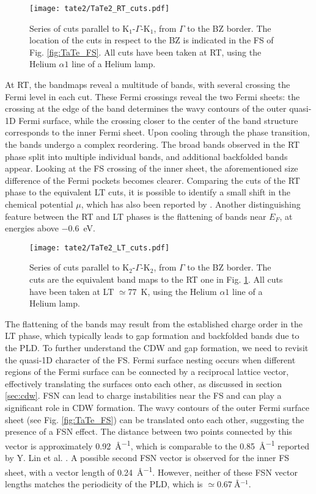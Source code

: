 \begin{figure}[t!]
	\centering
	\texttt{[image: tate2/TaTe2\_RT\_cuts.pdf]}
	\caption{Series of cuts parallel to K$_1$-$\Gamma$-K$_1$, from $\Gamma$ to the BZ border. The location of the cuts in respect to the BZ is indicated in the FS of Fig. \ref{fig:TaTe_FS}. All cuts have been taken at RT, using the Helium $\alpha1$ line of a Helium lamp.}
	\label{fig:TaTe_RT_cuts}
\end{figure}

At RT, the bandmaps reveal a multitude of bands, with several crossing the Fermi level in each cut.
These Fermi crossings reveal the two Fermi sheets: the crossing at the edge of the band determines the wavy contours of the outer quasi-1D Fermi surface, while the crossing closer to the center of the band structure corresponds to the inner Fermi sheet.
Upon cooling through the phase transition, the bands undergo a complex reordering.
The broad bands observed in the RT phase split into multiple individual bands, and additional backfolded bands appear.
Looking at the FS crossing of the inner sheet, the aforementioned size difference of the Fermi pockets becomes clearer.
Comparing the cuts of the RT phase to the equivalent LT cuts, it is possible to identify a small shift in the chemical potential $\mu$, which has also been reported by \cite{mitsuishi_unveiling_2024}.
Another distinguishing feature between the RT and LT phases is the flattening of bands near $E_F$, at energies above \qty{-0.6}{\electronvolt}.

\begin{figure}[h]
	\centering
	\texttt{[image: tate2/TaTe2\_LT\_cuts.pdf]}
	\caption{Series of cuts parallel to K$_2$-$\Gamma$-K$_2$, from $\Gamma$ to the BZ border. The cuts are the equivalent band maps to the RT one in Fig. \ref{fig:TaTe_RT_cuts}. All cuts have been taken at LT $\simeq$\qty{77}{\kelvin}, using the Helium $\alpha1$ line of a Helium lamp.}
	\label{fig:TaTe_LT_cuts}
\end{figure}

The flattening of the bands may result from the established charge order in the LT phase, which typically leads to gap formation and backfolded bands due to the PLD.
To further understand the CDW and gap formation, we need to revisit the quasi-1D character of the FS.
Fermi surface nesting occurs when different regions of the Fermi surface can be connected by a reciprocal lattice vector, effectively translating the surfaces onto each other, as discussed in section \ref{sec:cdw}.
FSN can lead to charge instabilities near the FS and can play a significant role in CDW formation.
The wavy contours of the outer Fermi surface sheet (see Fig. \ref{fig:TaTe_FS}) can be translated onto each other, suggesting the presence of a FSN effect.
The distance between two points connected by this vector is approximately \qty{0.92}{\angstrom^{-1}}, which is comparable to the \qty{0.85}{\angstrom^{-1}} reported by Y. Lin et al. \cite{lin_evidence_2022}.
A possible second FSN vector is observed for the inner FS sheet, with a vector length of \qty{0.24}{\angstrom^{-1}}.
However, neither of these FSN vector lengths matches the periodicity of the PLD, which is $\simeq\qty{0.67}{\angstrom^{-1}}$.


